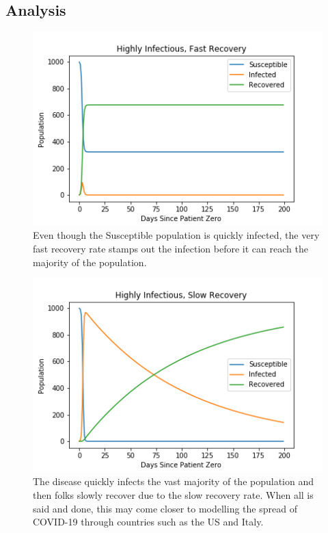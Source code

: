 \documentclass{article}
\begin{document}
\subsection{Analysis}



\begin{figure}[H]
    \centering
    \captionsetup{justification=centering}
    \includegraphics[width=0.8\linewidth]{images/HF.png}
    \caption{Even though the Susceptible population is quickly infected, the very fast recovery rate stamps out the infection before it can reach the majority of the population.}
    \label{fig:HF}
\end{figure}
\begin{figure}[H]
    \centering
    \captionsetup{justification=centering}
    \includegraphics[width=0.8\linewidth]{images/HH.png}
    \caption{The disease quickly infects the vast majority of the population and then folks slowly recover due to the slow recovery rate. When all is said and done, this may come closer to modelling the spread of COVID-19 through countries such as the US and Italy.}
    \label{fig:HH}
\end{figure}
\end{document}
